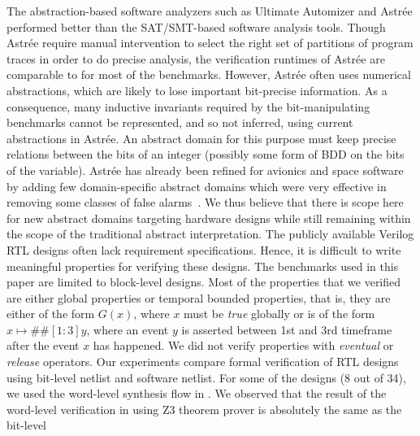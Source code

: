 %
The abstraction-based software analyzers such as Ultimate Automizer and Astr{\'e}e 
performed better than the SAT/SMT-based software analysis tools.  Though 
Astr{\'e}e require manual intervention to select the right set of partitions 
of program traces in order to do precise analysis, the verification runtimes 
of Astr{\'e}e are comparable to \ABC for most of the benchmarks.  However, 
Astr{\'e}e often uses numerical abstractions, which are likely to lose 
important bit-precise information.  
%
As a consequence, many inductive invariants required by the bit-manipulating 
benchmarks cannot be represented, and so not inferred, using current abstractions 
in Astr{\'e}e.  An abstract domain for this purpose must keep 
precise relations between the bits of an integer (possibly some 
form of BDD on the bits of the variable).  Astr{\'e}e has already been 
refined for avionics and space software by adding few domain-specific 
abstract domains which were very effective in removing some classes of 
false alarms~\cite{DBLP:journals/ftpl/BertraneCCFMMR15}.  We thus believe 
that there is scope here for new abstract domains targeting hardware 
designs while still remaining within the scope of the traditional abstract 
interpretation. 
%
%
The publicly available Verilog RTL designs often lack requirement 
specifications.  Hence, it is difficult to write meaningful 
properties for verifying these designs.  The benchmarks used 
in this paper are limited to block-level designs. 
%
Most of the properties that we verified are either global properties 
or temporal bounded properties, that is, they are either of the form 
$G(x)$, where $x$ must be \emph{true} globally or is of the form 
$x \mapsto \#\#[1:3] y$, where an event $y$ is asserted between 1st and 
3rd timeframe after the event $x$ has happened.  We did not verify 
properties with \emph{eventual} or \emph{release} operators. 
%
Our experiments compare formal verification of RTL designs using 
bit-level netlist and software netlist.  
%
For some of the designs (8 out of 34), we used the word-level synthesis 
flow in \ebmc.  
We observed that the result of the word-level verification in \ebmc 
using Z3 theorem prover is absolutely the same as the bit-level 
